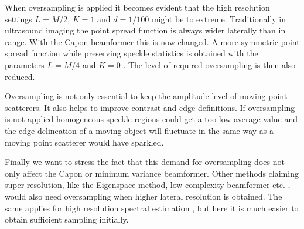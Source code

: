 \documentclass[journal]{IEEEtran}
\begin{document}
When oversampling is applied it becomes evident that the high resolution settings $L=M/2$, $K=1$ and $d=1/100$ might be to extreme. Traditionally in ultrasound imaging the point spread function is always wider laterally than in range. With the Capon beamformer this is now changed. A more symmetric point spread function while preserving speckle statistics is obtained with the parameters $L=M/4$ and $K=0$ \cite{Synnevag2007a}. The level of required oversampling is then also reduced. %

Oversampling is not only essential to keep the amplitude level of moving point scatterers. It also helps to improve contrast and edge definitions. If oversampling is not applied homogeneous speckle regions could get a too low average value and the edge delineation of a moving object will fluctuate in the same way as a moving point scatterer would have sparkled.

Finally we want to stress the fact that this demand for oversampling does not only affect the Capon or minimum variance beamformer. Other methods claiming super resolution, like the Eigenspace method, low complexity beamformer etc. \cite{Synnevag2011, Nilsen2009, Mehdizadeh2012a, Kim}, would also need oversampling when higher lateral resolution is obtained. The same applies for high resolution spectral estimation \cite{Ekroll2012}, but here it is much easier to obtain sufficient sampling initially. 


\end{document}
